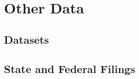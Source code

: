   
  


\section{Other Data}\label{sec:findings-other-data}\indent

\subsection{Datasets}\label{sec:findings-datasets}\indent

\subsection{State and Federal Filings}\label{sec:findings-state-federal-filings}\indent

